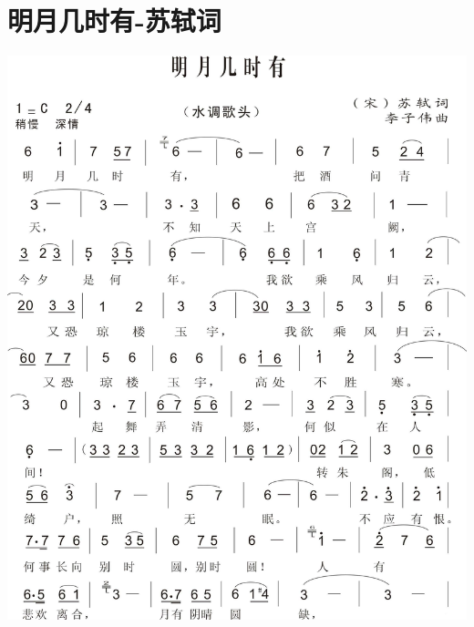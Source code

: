 \documentclass[cn,pad,chinese,chinesefont=nofont,math=newtx]{elegantbook}
\begin{document}
\section{明月几时有-苏轼词}
    \includegraphics[width=\textwidth]{dongxiao/20200411-明月几时有.jpg}
\end{document}
